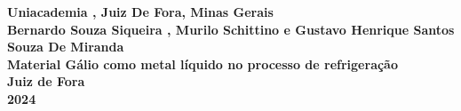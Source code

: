 \documentclass[12pt]{article}
\begin{document}
\pagestyle{fancy}
\fancyhf{}  
\fancyhead[R]{\small \thepage}
\fancyhead[L]{\small \leftmark}

\thispagestyle{empty} 
\begin{center}
    \textbf{Uniacademia , Juiz De Fora, Minas Gerais}\\
    \vspace{1cm}
    \textbf{Bernardo Souza Siqueira , Murilo Schittino e Gustavo Henrique Santos Souza De Miranda}\\
    \vspace{8cm}
    \textbf{Material Gálio como metal líquido no processo de refrigeração}\\
    \vspace{8cm}
    \textbf{Juiz de Fora}\\
    \textbf{2024}\\
\end{center}
\newpage

\tableofcontents
\newpage

\listoffigures
\newpage

\nocite{*}
\end{document}
